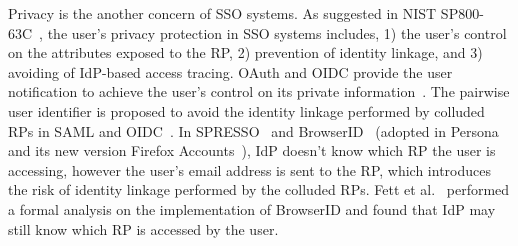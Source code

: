 Privacy is the another concern of  SSO systems.
As suggested in NIST SP800-63C~\cite{NIST2017draft}, the user's privacy protection in SSO systems includes, 1) the user's control on the attributes exposed to the RP, 2) prevention of identity linkage, and 3) avoiding of IdP-based access tracing.
OAuth and OIDC provide the user notification to achieve the user's control on its private information~\cite{ChenPCTKT14,YangLLZH16}.
The pairwise user identifier is proposed to avoid the identity linkage performed by colluded RPs in SAML and OIDC~\cite{OpenIDConnect,SAML}.
In SPRESSO~\cite{SPRESSO} and BrowserID~\cite{BrowserID} (adopted in Persona~\cite{persona} and its new version Firefox Accounts~\cite{FirefoxAccount}), IdP doesn't know which RP the user is accessing, however the user's email address is sent to the RP, which introduces the risk of identity linkage performed by the colluded RPs. Fett et al.~\cite{FettKS14, BrowserID} performed a formal analysis on the implementation of BrowserID and found that IdP may still know which RP is accessed by the user.


